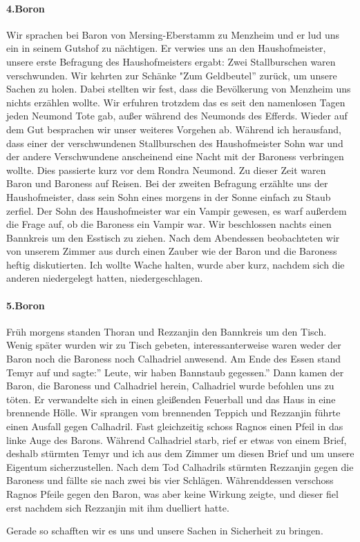 \paragraph{4.Boron}
Wir sprachen bei Baron von Mersing-Eberstamm zu Menzheim und er lud uns ein in seinem Gutshof zu nächtigen. Er verwies uns an den Haushofmeister, unsere erste Befragung des Haushofmeisters ergabt: Zwei Stallburschen waren verschwunden. Wir kehrten zur Schänke "Zum Geldbeutel'' zurück, um unsere Sachen zu holen. Dabei stellten wir fest, dass die Bevölkerung von Menzheim uns nichts erzählen wollte. Wir erfuhren trotzdem das es seit den namenlosen Tagen jeden Neumond Tote gab, außer während des Neumonds des Efferds. Wieder auf dem Gut besprachen wir unser weiteres Vorgehen ab.
Während ich herausfand, dass einer der verschwundenen Stallburschen des Haushofmeister Sohn war und der andere Verschwundene anscheinend eine Nacht mit der Baroness verbringen wollte. Dies passierte kurz vor dem Rondra Neumond. Zu dieser Zeit waren Baron und Baroness auf Reisen. Bei der zweiten Befragung erzählte uns der Haushofmeister, dass sein Sohn eines morgens in der Sonne einfach zu Staub zerfiel. Der Sohn des Haushofmeister war ein Vampir gewesen, es warf außerdem die Frage auf, ob die Baroness ein Vampir war. Wir beschlossen nachts einen Bannkreis um den Esstisch zu ziehen. Nach dem Abendessen beobachteten wir von unserem Zimmer aus durch einen Zauber wie der Baron und die Baroness heftig diskutierten. Ich wollte Wache halten, wurde aber kurz, nachdem sich die anderen niedergelegt hatten, niedergeschlagen.

\paragraph{5.Boron}
Früh morgens standen Thoran und Rezzanjin den Bannkreis um den Tisch. Wenig später wurden wir zu Tisch gebeten, interessanterweise waren weder der Baron noch die Baroness noch Calhadriel anwesend. Am Ende des Essen stand Temyr auf und sagte:'' Leute, wir haben Bannstaub gegessen.'' Dann kamen der Baron, die Baroness und Calhadriel herein, Calhadriel wurde befohlen uns zu töten. Er verwandelte sich in einen gleißenden Feuerball und das Haus in eine brennende Hölle.
Wir sprangen vom brennenden Teppich und Rezzanjin führte einen Ausfall gegen Calhadril. Fast gleichzeitig schoss Ragnos einen Pfeil in das linke Auge des Barons. Während Calhadriel starb, rief er etwas von einem Brief, deshalb stürmten Temyr und ich aus dem Zimmer um diesen Brief und um unsere Eigentum sicherzustellen. Nach dem Tod Calhadrils stürmten Rezzanjin gegen die Baroness und fällte sie nach zwei bis vier Schlägen. Währenddessen verschoss Ragnos Pfeile gegen den Baron, was aber keine Wirkung zeigte, und dieser fiel erst nachdem sich Rezzanjin mit ihm duelliert hatte.\par
Gerade so schafften wir es uns und unsere Sachen in Sicherheit zu bringen. 


